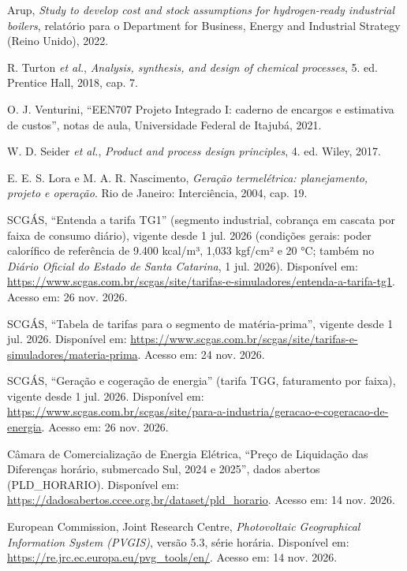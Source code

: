  Arup, \textit{Study to develop cost and stock assumptions for hydrogen-ready industrial boilers}, relatório para o Department for Business, Energy and Industrial Strategy (Reino Unido), 2022.

 R. Turton \textit{et al.}, \textit{Analysis, synthesis, and design of chemical processes}, 5. ed. Prentice Hall, 2018, cap. 7.

 O. J. Venturini, ``EEN707 Projeto Integrado I: caderno de encargos e estimativa de custos'', notas de aula, Universidade Federal de Itajubá, 2021.

 W. D. Seider \textit{et al.}, \textit{Product and process design principles}, 4. ed. Wiley, 2017.

 E. E. S. Lora e M. A. R. Nascimento, \textit{Geração termelétrica: planejamento, projeto e operação}. Rio de Janeiro: Interciência, 2004, cap. 19.

 SCGÁS, ``Entenda a tarifa TG1'' (segmento industrial, cobrança em cascata por faixa de consumo diário), vigente desde 1 jul. 2026 (condições gerais: poder calorífico de referência de 9.400 kcal/m³, 1,033 kgf/cm² e 20 °C; também no \textit{Diário Oficial do Estado de Santa Catarina}, 1 jul. 2026). Disponível em: \url{https://www.scgas.com.br/scgas/site/tarifas-e-simuladores/entenda-a-tarifa-tg1}. Acesso em: 26 nov. 2026.

 SCGÁS, ``Tabela de tarifas para o segmento de matéria-prima'', vigente desde 1 jul. 2026. Disponível em: \url{https://www.scgas.com.br/scgas/site/tarifas-e-simuladores/materia-prima}. Acesso em: 24 nov. 2026.

 SCGÁS, ``Geração e cogeração de energia'' (tarifa TGG, faturamento por faixa), vigente desde 1 jul. 2026. Disponível em: \url{https://www.scgas.com.br/scgas/site/para-a-industria/geracao-e-cogeracao-de-energia}. Acesso em: 26 nov. 2026.

 Câmara de Comercialização de Energia Elétrica, ``Preço de Liquidação das Diferenças horário, submercado Sul, 2024 e 2025'', dados abertos (PLD\_HORARIO). Disponível em: \url{https://dadosabertos.ccee.org.br/dataset/pld_horario}. Acesso em: 14 nov. 2026.

 European Commission, Joint Research Centre, \textit{Photovoltaic Geographical Information System (PVGIS)}, versão 5.3, série horária. Disponível em: \url{https://re.jrc.ec.europa.eu/pvg_tools/en/}. Acesso em: 14 nov. 2026.

